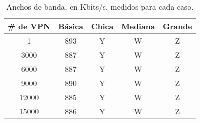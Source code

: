 \begin{table}[ht]
	\caption{Anchos de banda, en Kbits/s, medidos para cada caso.}
	\centering 
	\begin{tabular}{c c c c c}
		\hline\hline
		\# de VPN & Básica & Chica & Mediana  & Grande \\ [0.5ex]
		\hline
		1 & 893 & Y & W & Z \\
		3000 & 887 & Y & W & Z  \\
		6000 & 887 & Y & W & Z \\
		9000 & 890 & Y & W & Z \\
		12000 & 885 & Y & W & Z \\
		15000 & 886 & Y & W & Z \\ [1ex]
		\hline
	\end{tabular}
	\label{table:escala_de_servicios}
\end{table}

